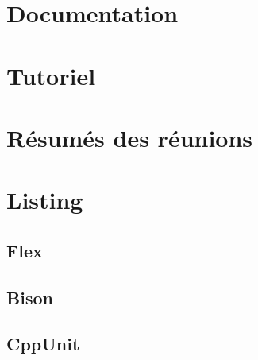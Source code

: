 \documentclass[a4paper,11pt]{report}
\begin{document}
\listoffigures
\listoftables
\lstlistoflistings

\appendix

\chapter{Documentation}




\chapter{Tutoriel}



\chapter{Résumés des réunions}









\chapter{Listing}
\section{Flex}
\label{lexer}

\section{Bison}
\label{parser}

\section{CppUnit}
\label{TestAgent}




\end{document}
